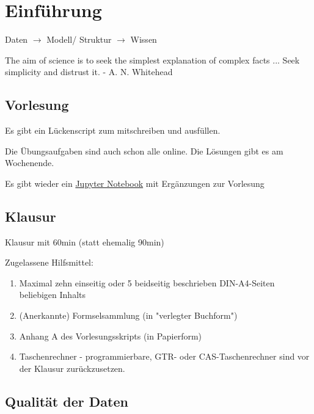 \documentclass[a4paper]{article}
\title{\docTitle}
\author{Moritz}
\date{\today}
\begin{document}
\maketitle
\tableofcontents


\section{Einführung}

Daten $\rightarrow$ Modell/ Struktur $\rightarrow$ Wissen

The aim of science is to seek the simplest explanation of complex facts ... Seek simplicity and distrust it. - A. N. Whitehead

\subsection{Vorlesung}

Es gibt ein Lückenscript zum mitschreiben und ausfüllen.

Die Übungsaufgaben sind auch schon alle online. Die Lösungen gibt es am Wochenende.

Es gibt wieder ein \href{https://github.com/jankodie/Statistik-Kurs}{Jupyter Notebook} mit Ergänzungen zur Vorlesung

\subsection{Klausur}

Klausur mit 60min (statt ehemalig 90min)

Zugelassene Hilfsmittel:

\begin{enumerate}
    \item Maximal zehn einseitig oder 5 beidseitig beschrieben DIN-A4-Seiten beliebigen Inhalts
    \item (Anerkannte) Formselsammlung (in "verlegter Buchform")
    \item Anhang A des Vorlesungsskripts (in Papierform)
    \item Taschenrechner - programmierbare, GTR- oder CAS-Taschenrechner sind vor der Klausur zurückzusetzen.
\end{enumerate}

\subsection{Qualität der Daten}
\end{document}
